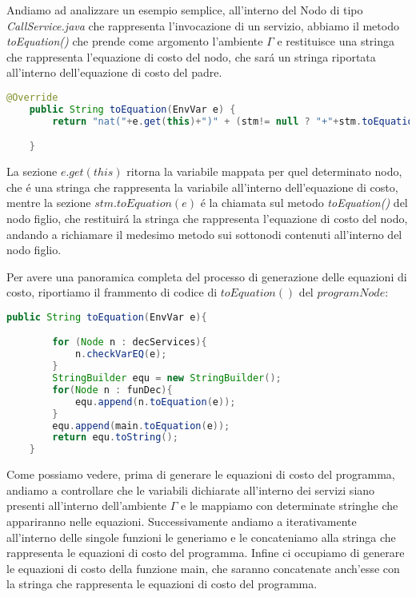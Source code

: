 \documentclass[../../main.tex]{subfiles}
\begin{document}
Andiamo ad analizzare un esempio semplice, all'interno del Nodo di tipo \textit{CallService.java} che rappresenta l'invocazione di un servizio, abbiamo il metodo \textit{toEquation()} che prende come argomento l'ambiente $\varGamma$ e restituisce una stringa che rappresenta l'equazione di costo del nodo, che sará un stringa riportata all'interno dell'equazione di costo del padre.

\begin{lstlisting}[language=Java]
    @Override
    public String toEquation(EnvVar e) {
        return "nat("+e.get(this)+")" + (stm!= null ? "+"+stm.toEquation(e) : "");

    }
\end{lstlisting}

La sezione $e.get(this)$ ritorna la variabile mappata per quel determinato nodo, che é una stringa che rappresenta la variabile all'interno dell'equazione di costo, mentre la sezione $stm.toEquation(e)$ é la chiamata sul metodo \textit{toEquation()} del nodo figlio, che restituirá la stringa che rappresenta l'equazione di costo del nodo, andando a richiamare il medesimo metodo sui sottonodi contenuti all'interno del nodo figlio.

Per avere una panoramica completa del processo di generazione delle equazioni di costo, riportiamo il frammento di codice di $toEquation()$ del $programNode$:
\begin{lstlisting}[language=Java]
    public String toEquation(EnvVar e){

        for (Node n : decServices){
            n.checkVarEQ(e);
        }
        StringBuilder equ = new StringBuilder();
        for(Node n : funDec){
            equ.append(n.toEquation(e));
        }
        equ.append(main.toEquation(e));
        return equ.toString();
    }
\end{lstlisting}

Come possiamo vedere, prima di generare le equazioni di costo del programma, andiamo a controllare che le variabili dichiarate all'interno dei servizi siano presenti all'interno dell'ambiente $\varGamma$ e le mappiamo con determinate stringhe che appariranno nelle equazioni. Successivamente andiamo a iterativamente all'interno delle singole funzioni le generiamo e le concateniamo alla stringa che rappresenta le equazioni di costo del programma.
Infine ci occupiamo di generare le equazioni di costo della funzione main, che saranno concatenate anch'esse con la stringa che rappresenta le equazioni di costo del programma.
\end{document}
